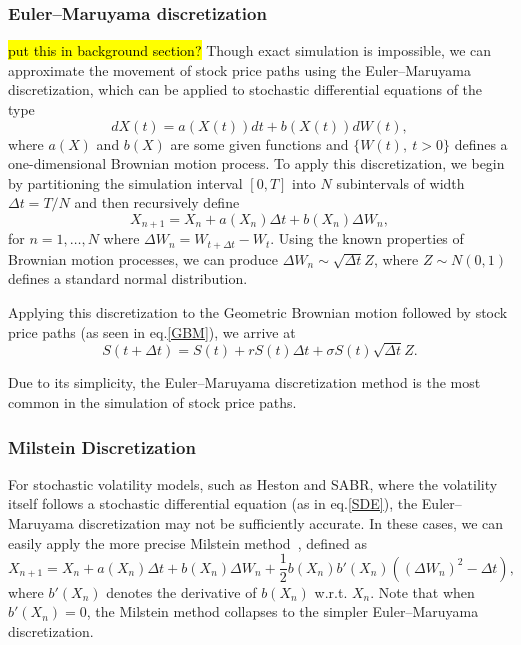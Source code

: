 \subsubsection{Euler–Maruyama discretization}
\hl{put this in background section?} Though exact simulation is impossible, we can approximate the movement of stock price paths using the Euler–Maruyama discretization, which can be applied to stochastic differential equations of the type
\begin{equation}\label{SDE}
dX(t)=a(X(t))dt+b(X(t))dW(t),
\end{equation}
\noindent where $a(X)$ and $b(X)$ are some given functions and $\{W(t),\ t>0\}$ defines a one-dimensional Brownian motion process.
To apply this discretization, we begin by partitioning the simulation interval $[0,T]$ into $N$ subintervals of width $\Delta t=T/N$ and then recursively define
\begin{equation}
X_{n+1}=X_n+a(X_n)\Delta t+b(X_n)\Delta W_n,
\end{equation}
\noindent for $n=1,\ldots,N$ where $\Delta W_n=W_{t+\Delta t}-W_{t}$.
Using the known properties of Brownian motion processes, we can produce $\Delta W_n\sim \sqrt{\Delta t}Z$, where $Z\sim N(0,1)$ defines a standard normal distribution.

Applying this discretization to the Geometric Brownian motion followed by stock price paths (as seen in eq.\eqref{GBM}), we arrive at
\begin{equation}
S(t+\Delta t)=S(t)+rS(t)\Delta t+\sigma S(t)\sqrt{\Delta t}Z.
\end{equation}

Due to its simplicity, the Euler–Maruyama discretization method is the most common in the simulation of stock price paths.


\subsubsection{Milstein Discretization}
For stochastic volatility models, such as Heston and SABR, where the volatility itself follows a stochastic differential equation (as in eq.\eqref{SDE}), the Euler–Maruyama discretization may not be sufficiently accurate. In these cases, we can easily apply the more precise Milstein method~\cite{Milstein}, defined as
\begin{equation}
X_{n+1}=X_n+a(X_n)\Delta t+b(X_n)\Delta W_n+\frac{1}{2}b(X_n)b'(X_n)((\Delta W_n)^2-\Delta t),
\end{equation}
\noindent where $b'(X_n)$ denotes the derivative of $b(X_n)$ w.r.t. $X_n$. Note that when $b'(X_n)=0$, the Milstein method collapses to the simpler Euler–Maruyama discretization.

